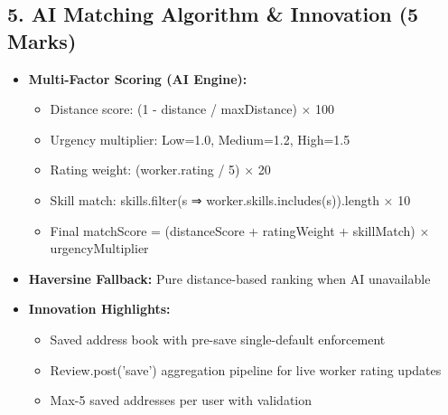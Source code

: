 \documentclass[12pt,a4paper]{article}
\begin{document}
\subsection*{5. AI Matching Algorithm \& Innovation (5 Marks)}
\begin{itemize}[leftmargin=*]
    \item \textbf{Multi-Factor Scoring (AI Engine):}
    \begin{itemize}
        \item Distance score: (1 - distance / maxDistance) × 100
        \item Urgency multiplier: Low=1.0, Medium=1.2, High=1.5
        \item Rating weight: (worker.rating / 5) × 20
        \item Skill match: skills.filter(s ⇒ worker.skills.includes(s)).length × 10
        \item Final matchScore = (distanceScore + ratingWeight + skillMatch) × urgencyMultiplier
    \end{itemize}
    \item \textbf{Haversine Fallback:} Pure distance-based ranking when AI unavailable
    \item \textbf{Innovation Highlights:}
    \begin{itemize}
        \item Saved address book with pre-save single-default enforcement
        \item Review.post('save') aggregation pipeline for live worker rating updates
        \item Max-5 saved addresses per user with validation
    \end{itemize}
\end{itemize}
\end{document}
